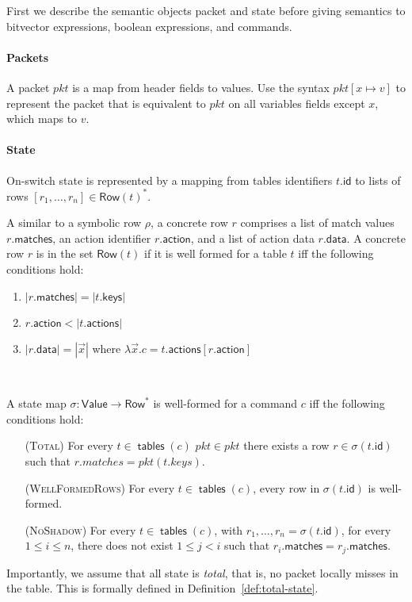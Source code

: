 \documentclass{article}
\newcommand{\pkt}{\mathit{pkt}}
\newcommand{\Value}{\mathsf{Value}}
\newcommand{\Row}{\mathsf{Row}}
\newcommand{\matches}{\mathsf{matches}}
\newcommand{\action}{\mathsf{action}}
\newcommand{\actions}{\mathsf{actions}}
\newcommand{\keys}{\mathsf{keys}}
\newcommand{\data}{\mathsf{data}}
\newcommand{\id}{\mathsf{id}}
\newcommand{\tables}{\mathop{\mathsf{tables}}}
\begin{document}
First we describe the semantic objects packet and state before giving semantics
to bitvector expressions, boolean expressions, and commands.

\paragraph{Packets}
A packet $\pkt$ is a map from header fields to values. Use the syntax $\pkt[x
  \mapsto v]$ to represent the packet that is equivalent to $\pkt$ on all variables
fields except $x$, which maps to $v$.

\paragraph{State}
On-switch state is represented by a mapping from tables identifiers $t.\id$ to
lists of rows $[r_1,\ldots,r_n] \in \Row(t)^*$.

A similar to a symbolic row $\rho$, a concrete row $r$ comprises a list of match
values $r.\matches$, an action identifier $r.\action$, and a list of action data
$r.\data$. A concrete row $r$ is in the set $\Row(t)$ if it is well formed for a
table $t$ iff the following conditions hold:
\begin{enumerate}
\item $|r.\matches| = |t.\keys|$
\item $r.\action < |t.\actions|$
\item $|r.\data| = |\vec x|$ where $\lambda \vec x. c = t.\actions[r.\action]$
\end{enumerate}\

A state map $\sigma : \Value \to \Row^*$ is well-formed for a command $c$ iff the
following conditions hold:
\begin{enumerate}[align=left]
\item[(\textsc{Total})] For every $t \in \tables(c)$ $\pkt \in \pkt$ there exists a row $r \in \sigma(t.\id)$ such that $r.matches = \pkt(t.keys)$.
\item[(\textsc{WellFormedRows})] For every $t\in \tables(c)$, every row in $\sigma(t.\id)$ is well-formed.
\item[(\textsc{NoShadow})] For every $t \in \tables(c)$, with $r_1,\ldots,r_n =
  \sigma(t.\id)$, for every $1 \leq i \leq n$, there does not exist $1 \leq j <
  i$ such that $r_i.\matches = r_j.\matches$.
\end{enumerate}

Importantly, we assume that all state is \emph{total}, that is, no packet locally misses
in the table. This is formally defined in Definition~\ref{def:total-state}.
\end{document}
